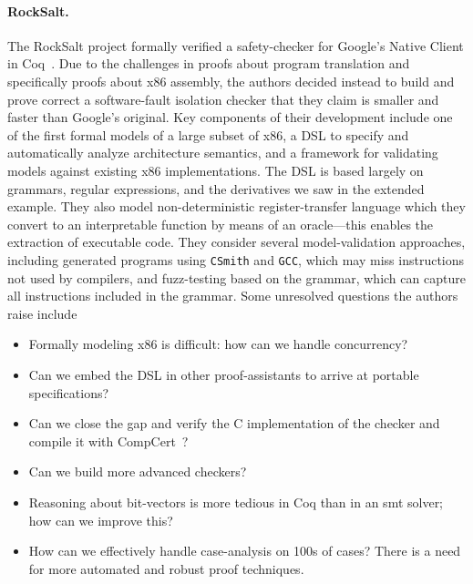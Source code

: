 \paragraph{RockSalt.} The RockSalt project formally verified a safety-checker
for Google's Native Client in Coq~\cite{Morrisett_2012}. Due to the challenges
in proofs about program translation and specifically proofs about x86 assembly,
the authors decided instead to build and prove correct a software-fault
isolation checker that they claim is smaller and faster than Google's original.
Key components of their development include one of the first formal models of a
large subset of x86, a DSL to specify and automatically analyze architecture
semantics, and a framework for validating models against existing x86
implementations. The DSL is based largely on grammars, regular expressions, and
the derivatives we saw in the extended example. They also model
non-deterministic register-transfer language which they convert to an
interpretable function by means of an oracle---this enables the extraction of
executable code. They consider several model-validation approaches, including
generated programs using \texttt{CSmith} and \texttt{GCC}, which may miss
instructions not used by compilers, and fuzz-testing based on the grammar, which
can capture all instructions included in the grammar. Some unresolved questions
the authors raise include
\begin{itemize}
    \item Formally modeling x86 is difficult: how can we handle concurrency?
    \item Can we embed the DSL in other proof-assistants to arrive at portable
        specifications?
    \item Can we close the gap and verify the C implementation of the checker
        and compile it with CompCert~\cite{Leroy-Compcert-CACM}?
    \item Can we build more advanced checkers?
    \item Reasoning about bit-vectors is more tedious in Coq than in an
        \gls{smt} solver; how can we improve this?
    \item How can we effectively handle case-analysis on 100s of cases? There is
        a need for more automated and robust proof techniques.
\end{itemize}

